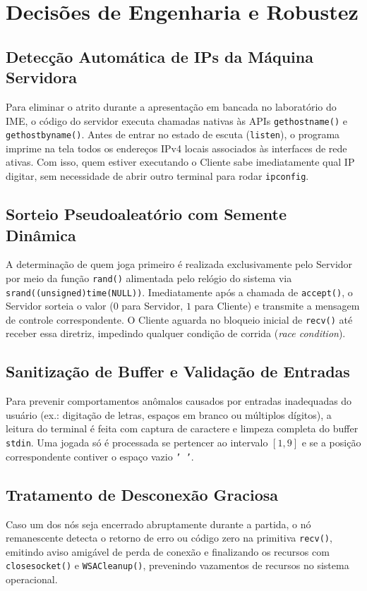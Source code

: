 \documentclass[a4paper,12pt]{article}
\begin{document}
\section{Decisões de Engenharia e Robustez}

\subsection{Detecção Automática de IPs da Máquina Servidora}
Para eliminar o atrito durante a apresentação em bancada no laboratório do IME, o código do servidor executa chamadas nativas às APIs \texttt{gethostname()} e \texttt{gethostbyname()}. Antes de entrar no estado de escuta (\texttt{listen}), o programa imprime na tela todos os endereços IPv4 locais associados às interfaces de rede ativas. Com isso, quem estiver executando o Cliente sabe imediatamente qual IP digitar, sem necessidade de abrir outro terminal para rodar \texttt{ipconfig}.

\subsection{Sorteio Pseudoaleatório com Semente Dinâmica}
A determinação de quem joga primeiro é realizada exclusivamente pelo Servidor por meio da função \texttt{rand()} alimentada pelo relógio do sistema via \texttt{srand((unsigned)time(NULL))}. Imediatamente após a chamada de \texttt{accept()}, o Servidor sorteia o valor ($0$ para Servidor, $1$ para Cliente) e transmite a mensagem de controle correspondente. O Cliente aguarda no bloqueio inicial de \texttt{recv()} até receber essa diretriz, impedindo qualquer condição de corrida (\textit{race condition}).

\subsection{Sanitização de Buffer e Validação de Entradas}
Para prevenir comportamentos anômalos causados por entradas inadequadas do usuário (ex.: digitação de letras, espaços em branco ou múltiplos dígitos), a leitura do terminal é feita com captura de caractere e limpeza completa do buffer \texttt{stdin}. Uma jogada só é processada se pertencer ao intervalo $[1, 9]$ e se a posição correspondente contiver o espaço vazio \texttt{' '}.

\subsection{Tratamento de Desconexão Graciosa}
Caso um dos nós seja encerrado abruptamente durante a partida, o nó remanescente detecta o retorno de erro ou código zero na primitiva \texttt{recv()}, emitindo aviso amigável de perda de conexão e finalizando os recursos com \texttt{closesocket()} e \texttt{WSACleanup()}, prevenindo vazamentos de recursos no sistema operacional.
\end{document}
